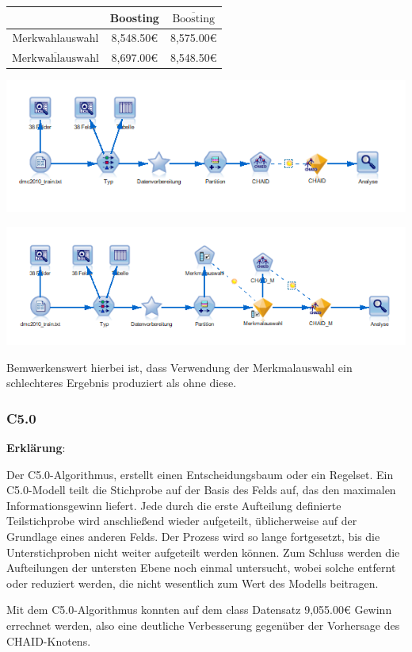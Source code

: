 \documentclass[a4paper,12pt]{article}
\newcounter{Algorithmus}
\begin{document}
\begin{center}
\begin{tabular}{ c | c | c }
 & Boosting & $\overline{\text{Boosting}}$
\\
\hline
Merkwahlauswahl  &  8,548.50\;\euro & 8,575.00\;\euro
\\
$\overline{\text{Merkwahlauswahl}}$ & 8,697.00\;\euro  &  8,548.50\;\euro
\\
\end{tabular}
\end{center}

\begin{center}
\includegraphics[width=\textwidth]{Screens/chaid}
\end{center}

\begin{center}
\includegraphics[width=\textwidth]{Screens/chaid_m}
\end{center}

Bemwerkenswert hierbei ist, dass Verwendung der Merkmalauswahl ein schlechteres Ergebnis produziert als ohne diese.
\subsubsection{C5.0}
{\bf Erklärung}:
\par
\vspace{0.2cm}
Der C5.0-Algorithmus, erstellt einen Entscheidungsbaum oder ein Regelset.
 Ein C5.0-Modell teilt die Stichprobe auf der Basis des Felds auf, das den maximalen
Informationsgewinn liefert. Jede durch die erste Aufteilung definierte Teilstichprobe wird anschließend
wieder aufgeteilt, üblicherweise auf der Grundlage eines anderen Felds. Der Prozess wird so lange fortgesetzt,
bis die Unterstichproben nicht weiter aufgeteilt werden können. Zum Schluss werden die Aufteilungen
der untersten Ebene noch einmal untersucht, wobei solche entfernt oder reduziert werden, die nicht
wesentlich zum Wert des Modells beitragen.
\par
\vspace{1cm}
Mit dem C5.0-Algorithmus konnten auf dem class Datensatz 9,055.00\;\euro\; Gewinn errechnet werden, also eine deutliche Verbesserung gegenüber der Vorhersage des CHAID-Knotens.
\end{document}
